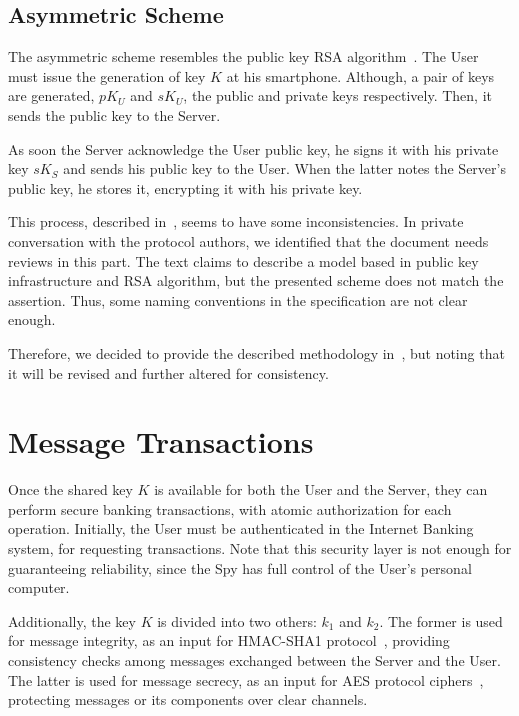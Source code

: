 \subsection{Asymmetric Scheme}
The asymmetric scheme resembles the public key RSA algorithm~\cite{RSA}. The User must issue the generation of key \(K\) at his smartphone. Although, a pair of keys are generated, \(pK_U\) and \(sK_U\), the public and private keys respectively. Then, it sends the public key to the Server.

As soon the Server acknowledge the User public key, he signs it with his private key $sK_S$ and sends his public key to the User. When the latter notes the Server's public key, he stores it, encrypting it with his private key.

This process, described in~\cite[p.78]{Peotta2012}, seems to have some inconsistencies. In private conversation with the protocol authors, we identified that the document needs reviews in this part. The text claims to describe a model based in public key infrastructure and RSA algorithm, but the presented scheme does not match the assertion. Thus, some naming conventions in the specification are not clear enough.

Therefore, we decided to provide the described methodology in~\cite{Peotta2012}, but noting that it will be revised and further altered for consistency.





\section{Message Transactions}
Once the shared key $K$ is available for both the User and the Server, they can perform secure banking transactions, with atomic authorization for each operation. Initially, the User must be authenticated in the Internet Banking system, for requesting transactions. Note that this security layer is not enough for guaranteeing reliability, since the Spy has full control of the User's personal computer.

Additionally, the key $K$ is divided into two others: $k_1$ and $k_2$. The former is used for message integrity, as an input for HMAC-SHA1 protocol~\cite{Bellare96}, providing consistency checks among messages exchanged between the Server and the User. The latter is used for message secrecy, as an input for AES protocol ciphers~\cite{AES}, protecting messages or its components over clear channels.

